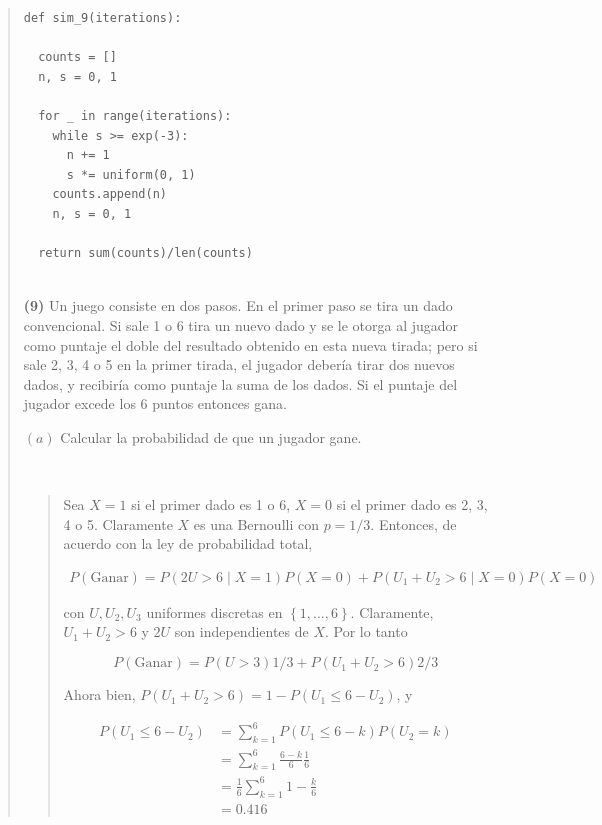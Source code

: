 \documentclass[a4paper, 12pt]{article}
\begin{document}
\begin{quote}
\begin{verbatim}
def sim_9(iterations):

  counts = []
  n, s = 0, 1

  for _ in range(iterations):
    while s >= exp(-3):
      n += 1
      s *= uniform(0, 1)
    counts.append(n)
    n, s = 0, 1
 
  return sum(counts)/len(counts)
  
\end{verbatim}




\pagebreak 

\textbf{(9)} Un juego consiste en dos pasos. En el primer paso se tira un dado
convencional. Si sale 1 o 6 tira un nuevo dado y se le otorga al jugador como
puntaje el doble del resultado obtenido en esta nueva tirada; pero si sale 2, 3,
4 o 5 en la primer tirada, el jugador debería tirar dos nuevos dados, y
recibiría como puntaje la suma de los dados. Si el puntaje del jugador excede
los 6 puntos entonces gana.

$(a)$ Calcular la probabilidad de que un jugador gane.  

~ 


\small
\begin{quote}

Sea $X = 1$ si el primer dado es 1 o 6, $X = 0$ si el primer dado es 2, 3, 4 o
5. Claramente $X$ es una Bernoulli con $p = 1 / 3$. Entonces, de acuerdo con la
ley de probabilidad total,

\begin{align*}
  P(\text{Ganar}) = P(2U > 6 \mid X = 1 )P(X = 0) + P(U_1 + U_2 > 6 \mid X = 0
  )P(X = 0 )
\end{align*}

con $U, U_2, U_3$ uniformes discretas en $\left\{ 1,\ldots,6 \right\} $.
Claramente, $U_1 + U_2 > 6$ y $2U$ son independientes de $X$. Por lo tanto 

\begin{equation*}
  P(\text{Ganar}) = P(U > 3) 1 / 3 + P(U_1 + U_2 > 6) 2 / 3
\end{equation*}

Ahora bien, $P(U_1 + U_2 > 6) = 1 - P(U_1 \leq 6 - U_2)$, y

\begin{align*}
  P(U_1 \leq 6 - U_2) 
  &= \sum_{k=1}^6 P(U_1 \leq 6 - k)P(U_2 = k) \\ 
  &=\sum_{k=1}^6 \frac{6-k}{6}\frac{1}{6} \\ 
  &=\frac{1}{6}\sum_{k=1}^6 1 - \frac{k}{6} \\ 
  &=0.416
\end{align*}


\end{quote}
\end{quote}
\end{document}
